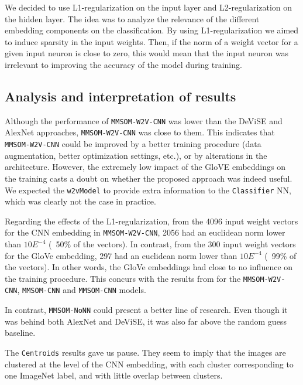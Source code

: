 \documentclass[a4paper]{standalone}
\begin{document}
We decided to use L1-regularization on the input layer and L2-regularization on the hidden layer. The idea was to analyze the relevance of the different embedding components on the classification. By using L1-regularization we aimed to induce sparsity in the input weights. Then, if the norm of a weight vector for a given input neuron is close to zero, this would mean that the input neuron was irrelevant to improving the accuracy of the model during training.

\subsection{Analysis and interpretation of results}\label{subsec:ImageClassificationAnalysis}

Although the performance of \verb|MMSOM-W2V-CNN| was lower than the DeViSE and AlexNet approaches, \verb|MMSOM-W2V-CNN| was close to them. This indicates that \verb|MMSOM-W2V-CNN| could be improved by a better training procedure (data augmentation, better optimization settings, etc.), or by alterations in the architecture. However, the extremely low impact of the GloVE embeddings on the training casts a doubt on whether the proposed approach was indeed useful. We expected the \verb|w2vModel| to provide extra information to the \verb|Classifier| NN, which was clearly not the case in practice.

Regarding the effects of the L1-regularization, from the 4096 input weight vectors for the CNN embedding in \verb|MMSOM-W2V-CNN|, 2056 had an euclidean norm lower than $10E^{-4}$ (~50\% of the vectors). In contrast, from the 300 input weight vectors for the GloVe embedding, 297 had an euclidean norm lower than $10E^{-4}$ (~99\% of the vectors). In other words, the GloVe embeddings had close to no influence on the training procedure. This concurs with the results from  for the \verb|MMSOM-W2V-CNN|, \verb|MMSOM-CNN| and \verb|MMSOM-CNN| models.

In contrast, \verb|MMSOM-NoNN| could present a better line of research. Even though it was behind both AlexNet and DeViSE, it was also far above the random guess baseline.

The \verb|Centroids| results gave us pause. They seem to imply that the images are clustered at the level of the CNN embedding, with each cluster corresponding to one ImageNet label, and with little overlap between clusters.
\end{document}

